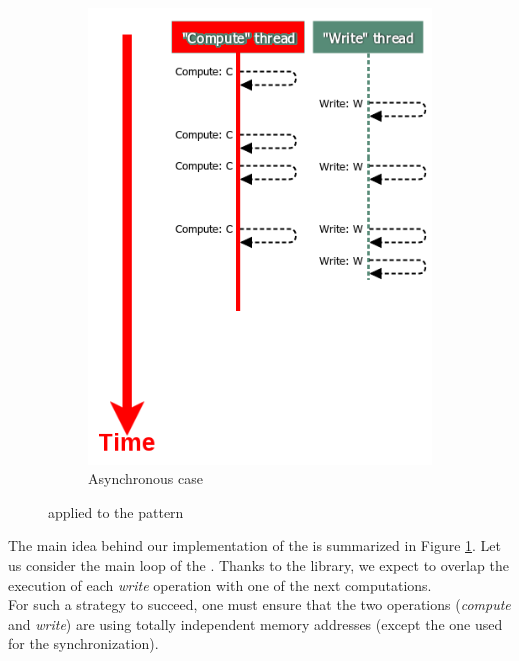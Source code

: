 \begin{figure}[!h]
				\begin{subfigure}[b]{0.475\textwidth}  
					\centering
					\includegraphics[width=\textwidth]{charts/internshipJulich_model_0-AIO-simple.png}
					\caption[]%
					{{\small Asynchronous case}}
				\end{subfigure}
				\caption{\notationAIO\space applied to the \toolTargetSoftware\space pattern}
				\label{fig:AIO_basis}
			\end{figure}

		The main idea behind our implementation of the \toolTargetSoftware\space is summarized in Figure \ref{fig:AIO_basis}.   Let us consider the main loop of the \toolTargetSoftware.   Thanks to the \notationaioShort\space library, we expect to overlap the execution of each \emph{write} operation with one of the next computations.\\
		For such a strategy to succeed, one must ensure that the two operations (\emph{compute} and \emph{write}) are using totally independent memory addresses (except the one used for the synchronization).

